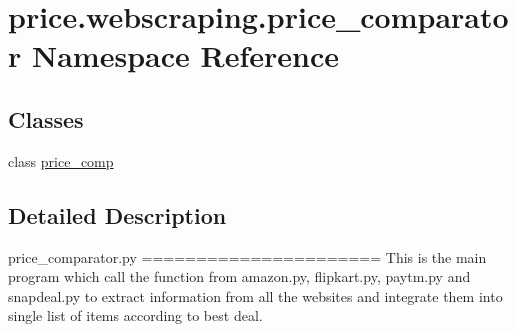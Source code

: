 \hypertarget{namespaceprice_1_1webscraping_1_1price__comparator}{}\section{price.\+webscraping.\+price\+\_\+comparator Namespace Reference}
\label{namespaceprice_1_1webscraping_1_1price__comparator}
\subsection*{Classes}
\begin{DoxyCompactItemize}
\item 
class \hyperlink{classprice_1_1webscraping_1_1price__comparator_1_1price__comp}{price\+\_\+comp}
\end{DoxyCompactItemize}


\subsection{Detailed Description}
\begin{DoxyVerb}price_comparator.py
======================
This is the main program which call the function from amazon.py, flipkart.py, paytm.py and snapdeal.py to extract information from all the websites and integrate them into single list of items according to best deal. 
\end{DoxyVerb}
 